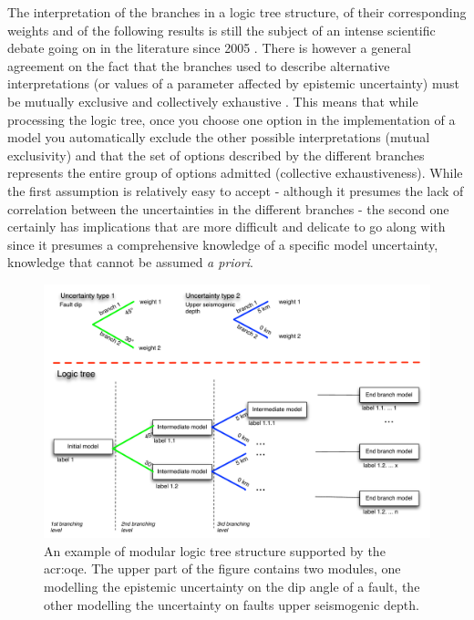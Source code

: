 The interpretation of the branches in a logic tree structure, of their 
corresponding weights and of the following results is still the subject 
of an intense scientific debate going on in the literature since 2005 
\parencite{abrahamson2005,mcguire2005,scherbaum2011,musson2012}.
%
There is however a general agreement on the fact that the branches used to 
describe alternative interpretations (or values of a parameter affected by
epistemic uncertainty) must be mutually exclusive and collectively exhaustive
\parencite{bommer2008}. 
%
This means that while processing the logic tree, once you choose one option 
in the implementation of a model you automatically exclude the other possible 
interpretations (mutual exclusivity) and that the set of options described 
by the different branches represents the entire group of options admitted 
(collective exhaustiveness). 
%
While the first assumption is relatively easy to accept - although it presumes 
the lack of correlation between the uncertainties in the different branches - 
the second one certainly has implications that are more difficult and delicate 
to go along with since it presumes a comprehensive knowledge of a specific 
model uncertainty, knowledge that cannot be assumed \textit{a priori}. 
%
\begin{figure}[!ht]
\includegraphics[width=\textwidth]{./Pictures/lts/logic_tree.pdf}
\caption{An example of modular logic tree structure supported by the
    \gls{acr:oqe}. The upper part of the figure contains two modules, one
    modelling the epistemic uncertainty on the dip angle of a fault, the 
    other modelling the uncertainty on faults upper seismogenic depth.}
\label{fig:logic_tree}
\end{figure}
%
